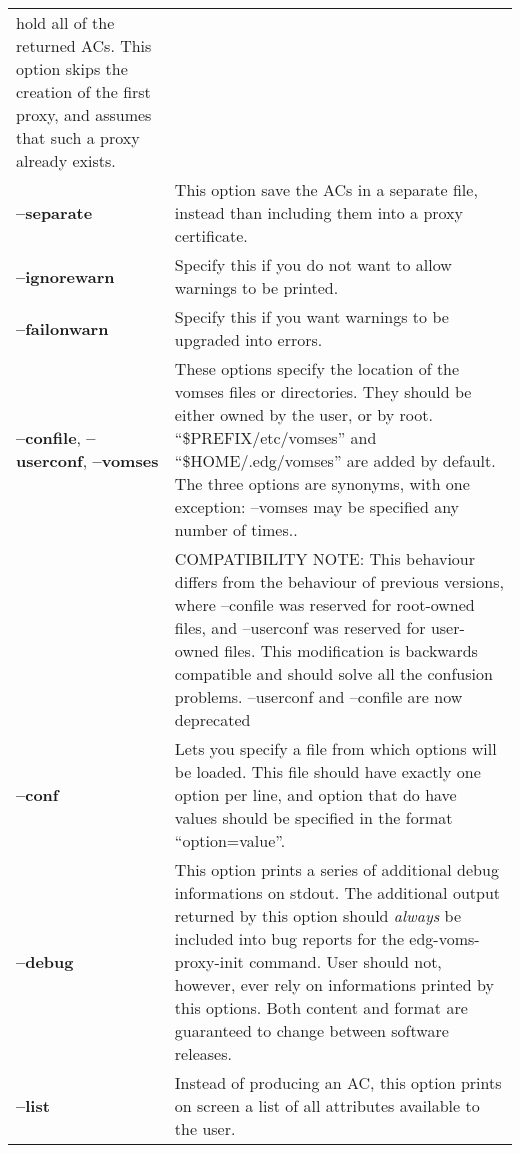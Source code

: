 \documentclass[a4paper]{book}
\begin{document}
\begin{longtable}{lp{3in}}
		      hold all of the returned ACs.  This option skips
		      the creation of the first proxy, and assumes
		      that such a proxy already exists.\\
\textbf{--separate} & This option save the ACs in a separate file,
		      instead than including them into a proxy
		      certificate.\\ 
\textbf{--ignorewarn} & Specify this if you do not want to allow
		      warnings to be printed.\\
\textbf{--failonwarn} & Specify this if you want warnings to be
		      upgraded into errors.\\
\textbf{--confile}, 
\textbf{--userconf},
\textbf{--vomses} & These options specify the location of the vomses files or directories.
                    They should be either owned by the user, or by root. ``\$PREFIX/etc/vomses''
                    and ``\$HOME/.edg/vomses'' are added by default.  The three options are synonyms,
                    with one exception: --vomses may be specified any number of times..\\
\                 & COMPATIBILITY NOTE: This behaviour differs from the behaviour of previous versions,
                    where --confile was reserved for root-owned files, and --userconf was reserved for
                    user-owned files. This modification is backwards compatible and should solve all
                    the confusion problems. --userconf and --confile are now deprecated\\
\textbf{--conf}     & Lets you specify a file from which options will
		      be loaded.  This file should have exactly one
		      option per line, and option that do have values
		      should be specified in the format
		      ``option=value''.\\ 
\textbf{--debug}    & This option prints a series of additional debug
		      informations on stdout.  The additional output
		      returned by this option should \emph{always} be
		      included into bug reports for the
		      edg-voms-proxy-init command.  User should not,
		      however, ever rely on informations printed by
		      this options.  Both content and format are
		      guaranteed to change between software
		      releases.\\
\textbf{--list} & Instead of producing an AC, this option prints on screen
          a list of all attributes available to the user.\\
\end{longtable}
\end{document}
